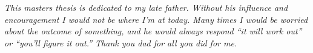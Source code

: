 \chapter*{}
\begin{center}
{\centering \it This masters thesis is dedicated to my late father. Without his influence and encouragement I would not be where I'm at today. Many times I would be worried about the outcome of something, and he would always respond ``it will work out'' or ``you'll figure it out.'' Thank you dad for all you did for me.}
\end{center} 